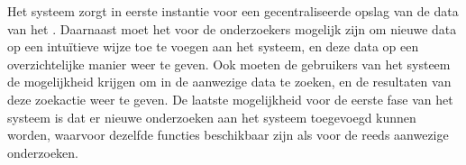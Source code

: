 Het systeem zorgt in eerste instantie voor een gecentraliseerde opslag van de data van het \casamproject.
Daarnaast moet het voor de onderzoekers mogelijk zijn om nieuwe data op een intu\"itieve wijze toe te voegen aan het systeem, en deze data op een overzichtelijke manier weer te geven.
Ook moeten de gebruikers van het systeem de mogelijkheid krijgen om in de aanwezige data te zoeken, en de resultaten van deze zoekactie weer te geven.
De laatste mogelijkheid voor de eerste fase van het systeem is dat er nieuwe onderzoeken aan het systeem toegevoegd kunnen worden, waarvoor dezelfde functies beschikbaar zijn als voor de reeds aanwezige onderzoeken.
